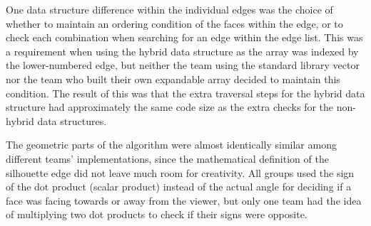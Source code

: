 \documentclass[10pt,twocolumn]{article}
\begin{document}
One data structure difference within the individual edges was the choice of whether to maintain an ordering condition of the faces within the edge, or to check each combination when searching for an edge within the edge list.  This was a requirement when using the hybrid data structure as the array was indexed by the lower-numbered edge, but neither the team using the standard library vector nor the team who built their own expandable array decided to maintain this condition.  The result of this was that the extra traversal steps for the hybrid data structure had approximately the same code size as the extra checks for the non-hybrid data structures.  

The geometric parts of the algorithm were almost identically similar among different teams' implementations, since the mathematical definition of the silhouette edge did not leave much room for creativity.  All groups used the sign of the dot product (scalar product) instead of the actual angle for deciding if a face was facing towards or away from the viewer, but only one team had the idea of multiplying two dot products to check if their signs were opposite.  
\end{document}
